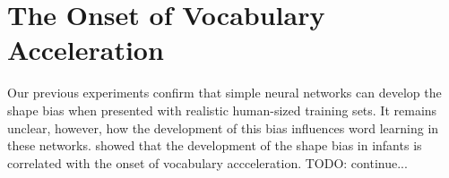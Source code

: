\section{The Onset of Vocabulary Acceleration}
\label{sec:vocab_accel}
Our previous experiments confirm that simple neural networks can develop the shape
bias when presented with realistic human-sized training sets. It remains unclear,
however, how the development of this bias influences word learning in these
networks. \cite{GershkoffStowe2004} showed that the development of the shape bias
in infants is correlated with the onset of vocabulary accceleration. TODO: continue...